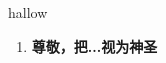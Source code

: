 
\begin{frame}
{\huge hallow}
\begin{center}
\begin{enumerate}\Large
  \item \textbf{尊敬，把...视为神圣}
\end{enumerate}
\end{center}
\end{frame}
